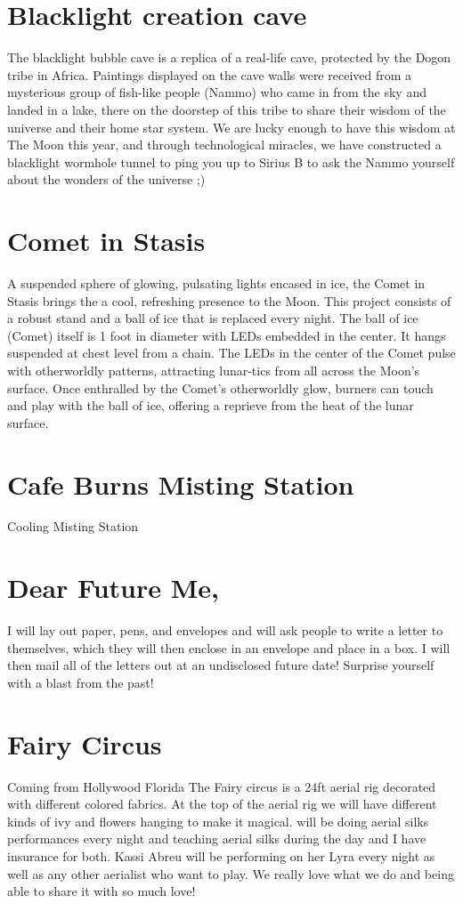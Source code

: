 \section*{Blacklight creation cave }
The blacklight bubble cave is a replica of a real-life cave, protected by the Dogon tribe in Africa. Paintings displayed on the cave walls were received from a mysterious group of fish-like people (Nammo) who came in from the sky and landed in a lake, there on the doorstep of this tribe to share their wisdom of the universe and their home star system. We are lucky enough to have this wisdom at The Moon this year, and through technological miracles, we have constructed a blacklight wormhole tunnel to ping you up to Sirius B to ask the Nammo yourself about the wonders of the universe ;) 

\section*{Comet in Stasis}
A suspended sphere of glowing, pulsating lights encased in ice, the Comet in Stasis brings the a cool, refreshing presence to the Moon. This project consists of a robust stand and a ball of ice that is replaced every night. The ball of ice (Comet) itself is 1 foot in diameter with LEDs embedded in the center. It hangs suspended at chest level from a chain. The LEDs in the center of the Comet pulse with otherworldly patterns, attracting lunar-tics from all across the Moon's surface. Once enthralled by the Comet's otherworldly glow, burners can touch and play with the ball of ice, offering a reprieve from the heat of the lunar surface.


\section*{Cafe Burns Misting Station}
Cooling Misting Station 


\section*{Dear Future Me,}
I will lay out paper, pens, and envelopes and will ask people to write a letter to themselves, which they will then enclose in an envelope and place in a box. I will then mail all of the letters out at an undisclosed future date! Surprise yourself with a blast from the past! 

\section*{Fairy Circus}
Coming from Hollywood Florida The Fairy circus is a 24ft aerial rig decorated with different colored fabrics. At the top of the aerial rig we will have different kinds of ivy and flowers hanging to make it magical. will be doing aerial silks performances every night and teaching aerial silks during the day and I have insurance for both. Kassi Abreu will be performing on her Lyra every night as well as any other aerialist who want to play. We really love what we do and being able to share it with so much love! 


